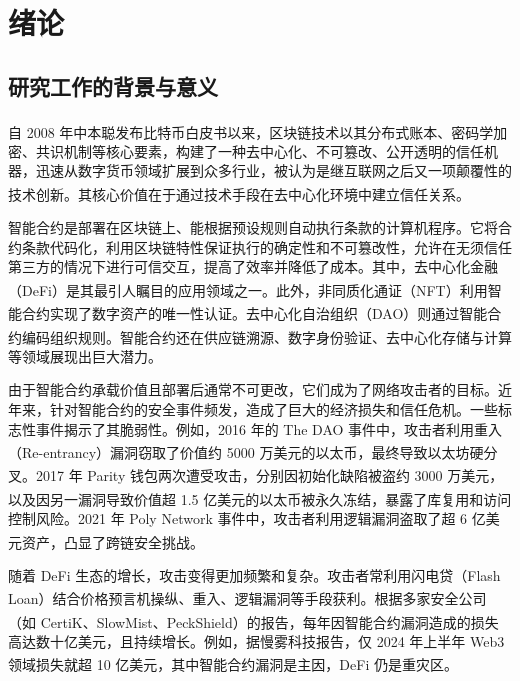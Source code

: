 \documentclass[print, master, vlined, timesmath]{DissertUESTC}
\begin{document}
\chapter{绪\hspace{6pt}论}

\section{研究工作的背景与意义}

自 2008 年中本聪发布比特币白皮书\textsuperscript{\cite{...}}以来，区块链技术以其分布式账本、密码学加密、共识机制等核心要素，构建了一种去中心化、不可篡改、公开透明的信任机器，迅速从数字货币领域扩展到众多行业，被认为是继互联网之后又一项颠覆性的技术创新\textsuperscript{\cite{BlockchainRevolution_2016}}。其核心价值在于通过技术手段在去中心化环境中建立信任关系。

智能合约是部署在区块链上、能根据预设规则自动执行条款的计算机程序。它将合约条款代码化，利用区块链特性保证执行的确定性和不可篡改性，允许在无须信任第三方的情况下进行可信交互，提高了效率并降低了成本。其中，去中心化金融（DeFi）\textsuperscript{\cite{DecentralizedFinance_2020}}是其最引人瞩目的应用领域之一。此外，非同质化通证（NFT）\textsuperscript{\cite{MappingNFT_2021}}利用智能合约实现了数字资产的唯一性认证。去中心化自治组织（DAO）\textsuperscript{\cite{DecentralizedAutonomous_2021}}则通过智能合约编码组织规则。智能合约还在供应链溯源\textsuperscript{\cite{Blockchaintechnology_2019}}、数字身份验证\textsuperscript{\cite{surveyessential_2018}}、去中心化存储与计算\textsuperscript{\cite{ComprehensiveSurvey_2023}}等领域展现出巨大潜力。

由于智能合约承载价值且部署后通常不可更改，它们成为了网络攻击者的目标。近年来，针对智能合约的安全事件频发，造成了巨大的经济损失和信任危机。一些标志性事件揭示了其脆弱性。例如，2016 年的 The DAO 事件中，攻击者利用重入（Re-entrancy）漏洞\textsuperscript{\cite{FormalAnalysis_2023}}窃取了价值约 5000 万美元的以太币，最终导致以太坊硬分叉\textsuperscript{\cite{Stickfork_2017}}。2017 年 Parity 钱包两次遭受攻击，分别因初始化缺陷被盗约 3000 万美元\textsuperscript{\cite{SmartContract_2020}}，以及因另一漏洞导致价值超 1.5 亿美元的以太币被永久冻结\textsuperscript{\cite{Smartcontracts_2018}}，暴露了库复用和访问控制风险。2021 年 Poly Network 事件中，攻击者利用逻辑漏洞盗取了超 6 亿美元资产\textsuperscript{\cite{}}，凸显了跨链安全挑战。

随着 DeFi 生态的增长，攻击变得更加频繁和复杂。攻击者常利用闪电贷（Flash Loan）结合价格预言机操纵、重入、逻辑漏洞等手段获利\textsuperscript{\cite{AttackingDeFi_2021a}}。根据多家安全公司（如 CertiK\textsuperscript{\cite{...}}、SlowMist\textsuperscript{\cite{...}}、PeckShield\textsuperscript{\cite{...}}）的报告，每年因智能合约漏洞造成的损失高达数十亿美元，且持续增长。例如，据慢雾科技报告，仅 2024 年上半年 Web3 领域损失就超 10 亿美元\textsuperscript{\cite{...}}，其中智能合约漏洞是主因，DeFi 仍是重灾区。
\end{document}
